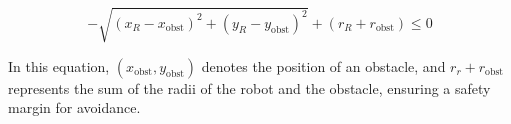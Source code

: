 \documentclass[conference]{IEEEtran}
\begin{document}
\begin{equation}
\label{eq:collision_condition}
-\sqrt{(x_R - x_{\text{obst}})^2 + (y_R - y_{\text{obst}})^2} + (r_R + r_{\text{obst}}) \leq 0
\end{equation}

In this equation, \( (x_{\text{obst}}, y_{\text{obst}}) \) denotes the position of an obstacle, and \( r_r + r_{\text{obst}}\) represents the sum of the radii of the robot and the obstacle, ensuring a safety margin for avoidance. 

{\small


}


\clearpage 
\end{document}
